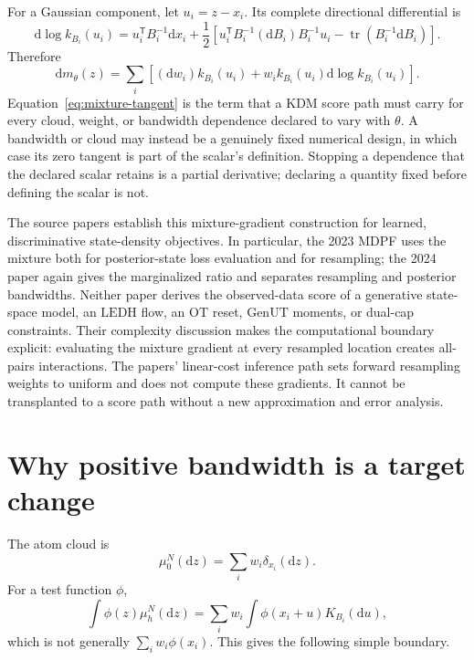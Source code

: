 \documentclass[11pt]{article}
\newcommand{\dd}{\mathrm{d}}
\newcommand{\LEDH}{\ensuremath{\mathrm{LEDH}}}
\newcommand{\GenUT}{\ensuremath{\mathrm{GenUT}}}
\newcommand{\OT}{\ensuremath{\mathrm{OT}}}
\begin{document}
For a Gaussian component, let $u_i=z-x_i$.  Its complete directional
differential is
\begin{equation}
 \dd\log k_{B_i}(u_i)
 =
 u_i^\mathsf{T}B_i^{-1}\dd x_i
 +\frac12\left[
   u_i^\mathsf{T}B_i^{-1}(\dd B_i)B_i^{-1}u_i
   -\operatorname{tr}(B_i^{-1}\dd B_i)
 \right].
 \label{eq:component-tangent}
\end{equation}
Therefore
\begin{equation}
 \dd m_\theta(z)
 =\sum_i\left[
       (\dd w_i)k_{B_i}(u_i)
       +w_i k_{B_i}(u_i)\dd\log k_{B_i}(u_i)
     \right]. \label{eq:mixture-tangent}
\end{equation}
Equation~\eqref{eq:mixture-tangent} is the term that a KDM score path must
carry for every cloud, weight, or bandwidth dependence declared to vary with
$\theta$.  A bandwidth or cloud may instead be a genuinely fixed numerical
design, in which case its zero tangent is part of the scalar's definition.
Stopping a dependence that the declared scalar retains is a partial
derivative; declaring a quantity fixed before defining the scalar is not.

The source papers establish this mixture-gradient construction for learned,
discriminative state-density objectives.  In particular, the 2023 MDPF uses
the mixture both for posterior-state loss evaluation and for resampling; the
2024 paper again gives the marginalized ratio and separates resampling and
posterior bandwidths.  Neither paper derives the observed-data score of a
generative state-space model, an \LEDH{} flow, an \OT{} reset, \GenUT{}
moments, or dual-cap constraints.  Their complexity discussion makes the
computational boundary explicit: evaluating the mixture gradient at every
resampled location creates all-pairs interactions.  The papers' linear-cost
inference path sets forward resampling weights to uniform and does not compute
these gradients.  It cannot be transplanted to a score path without a new
approximation and error analysis.

\section{Why positive bandwidth is a target change}

The atom cloud is
\begin{equation}
 \mu_0^N(\dd z)=\sum_i w_i\delta_{x_i}(\dd z).
 \label{eq:atom-measure}
\end{equation}
For a test function $\phi$,
\begin{equation}
 \int\phi(z)\mu_h^N(\dd z)
 =\sum_i w_i\int\phi(x_i+u)K_{B_i}(\dd u),
 \label{eq:smoothed-functional}
\end{equation}
which is not generally $\sum_i w_i\phi(x_i)$.  This gives the following
simple boundary.
\end{document}
